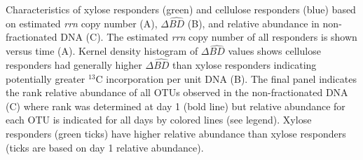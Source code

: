 Characteristics of xylose responders (green) and cellulose responders (blue)
based on estimated \textit{rrn} copy number (A), $\Delta\hat{BD}$ (B), and
relative abundance in non-fractionated DNA (C). The estimated \textit{rrn} copy
number of all responders is shown versus time (A). Kernel density histogram of
$\Delta\hat{BD}$ values shows cellulose responders had generally higher
$\Delta\hat{BD}$ than xylose responders indicating potentially greater $^{13}$C
incorporation per unit DNA (B). The final panel indicates the rank relative
abundance of all OTUs observed in the non-fractionated DNA (C) where rank was
determined at day 1 (bold line) but relative abundance for each OTU is
indicated for all days by colored lines (see legend). Xylose responders (green
ticks) have higher relative abundance than xylose responders (ticks are based
on day 1 relative abundance).
